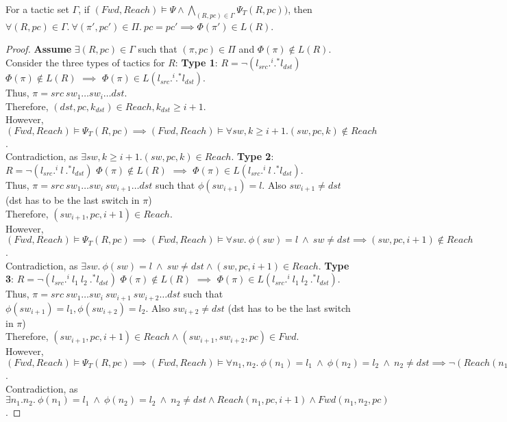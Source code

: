 \begin{theorem}[Soundness]
	For a tactic set $\Gamma$, if $(Fwd, Reach) \models \Psi \wedge \bigwedge\limits_{(R, pc) \in \Gamma} \Psi_T(R,pc)) $, 
	then $\forall (R, pc) \in \Gamma. ~\forall(\pi', pc') \in \Pi. ~pc = pc' \implies \Phi(\pi') \in L(R)$.
\end{theorem}
\begin{proof}
	\textbf{Assume} $\exists (R,pc) \in \Gamma$ such that $(\pi, pc) \in \Pi$ and $\Phi(\pi) \not\in L(R)$.
	Consider the three types of tactics for $R$: \newline
	\textbf{Type 1}: $R = \neg (l_{src} .^i .^* l_{dst})$ \\
	$\Phi(\pi) \not\in L(R)$ $\implies$ $\Phi(\pi) \in L(l_{src} .^i .^* l_{dst})$. \\
	Thus, $\pi = src\ sw_1 \ldots sw_i \ldots dst$. \\
	Therefore,  $(dst, pc, k_{dst}) \in Reach, k_{dst} \geq i + 1$. \\
	However, $(Fwd, Reach) \models \Psi_T(R, pc) \implies (Fwd, Reach) \models \forall sw,k \geq i + 1. (sw,pc,k) \notin Reach$.\\
	Contradiction, as $\exists sw, k \geq i + 1. (sw,pc,k) \in Reach$.
	\newline
	\newline
	\textbf{Type 2}: $R = \neg (l_{src} .^i \ l \ .^* l_{dst})$ \newline
	$\Phi(\pi) \not\in L(R)$ $\implies$ $\Phi(\pi) \in L (l_{src} .^i \ l \ .^* l_{dst})$. \\
	Thus, $\pi = src\ sw_1 \ldots sw_i \ sw_{i+1} \ldots dst$ such that $\phi(sw_{i+1}) = l$. Also $sw_{i+1} \not=dst$ (dst has to be the last switch in $\pi$)\\
	Therefore,  $(sw_{i+1}, pc, i+1) \in Reach$. \\
	However,
	$(Fwd, Reach) \models \Psi_T(R, pc) \implies (Fwd, Reach) \models \forall sw.~ \phi(sw) = l ~\wedge~ sw \not= dst \implies  (sw, pc, i + 1) \notin Reach$. \\
	Contradiction, as $\exists sw. ~ \phi(sw) = l ~\wedge~ sw \not= dst \wedge (sw,pc,i+1) \in Reach$.
	\newline \newline
	\textbf{Type 3}: $R = \neg (l_{src} .^i \ l_1 \ l_2 \ .^* l_{dst})$ \newline
	$\Phi(\pi) \not\in L(R)$ $\implies$ $\Phi(\pi) \in L (l_{src} .^i \ l_1 \ l_2 \ .^* l_{dst})$. \\
	Thus, $\pi = src\ sw_1 \ldots sw_i \ sw_{i+1} \ sw_{i+2} \ldots dst$ such that $\phi(sw_{i+1}) = l_1, \phi(sw_{i+2}) = l_2$. Also $sw_{i+2} \not=dst$ (dst has to be the last switch in $\pi$)\\
	Therefore,  $(sw_{i+1}, pc, i+1) \in Reach \wedge (sw_{i+1}, sw_{i+2}, pc) \in Fwd$. \\
	However,
	$(Fwd, Reach) \models \Psi_T(R, pc) \implies (Fwd, Reach) \models \forall n_1, n_2.~\phi(n_1) = l_1~\wedge~ \phi(n_2) = l_2 ~\wedge~ n_2 \not=dst  \implies 
	\neg (Reach(n_1, pc, i + 1) \wedge Fwd(n_1, n_2, pc))$. \\
	Contradiction, as $\exists n_1. n_2. ~\phi(n_1) = l_1~\wedge~ \phi(n_2) = l_2 ~\wedge~ n_2 \not=dst \wedge Reach(n_1, pc, i + 1) \wedge Fwd(n_1, n_2, pc)$. 
\end{proof}
